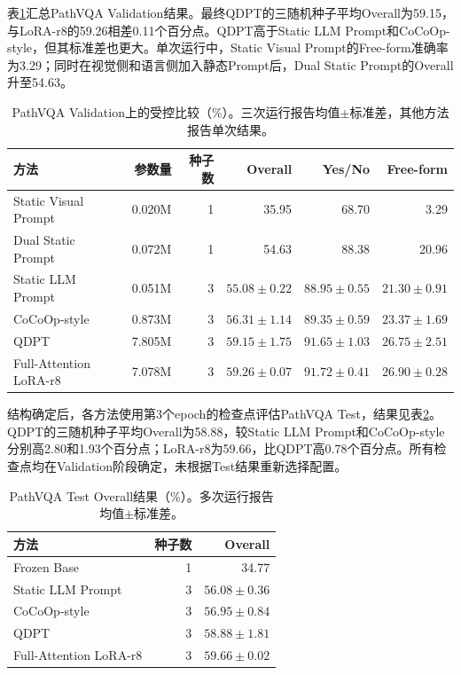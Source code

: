 \documentclass[pdflatex,sn-mathphys-num]{sn-jnl}
\begin{document}
表\ref{tab:pathvqa-main}汇总PathVQA Validation结果。最终QDPT的三随机种子平均Overall为59.15，与LoRA-r8的59.26相差0.11个百分点。QDPT高于Static LLM Prompt和CoCoOp-style，但其标准差也更大。单次运行中，Static Visual Prompt的Free-form准确率为3.29；同时在视觉侧和语言侧加入静态Prompt后，Dual Static Prompt的Overall升至54.63。

\begin{table}[t]
    \centering
    \caption{PathVQA Validation上的受控比较（\%）。三次运行报告均值$\pm$标准差，其他方法报告单次结果。}
    \label{tab:pathvqa-main}
    \scriptsize
    \setlength{\tabcolsep}{2pt}
    \begin{tabular}{@{}lrrrrr@{}}
        \toprule
        方法 & 参数量 & 种子数 & Overall & Yes/No & Free-form \\
        \midrule
        Static Visual Prompt & 0.020M & 1 & 35.95 & 68.70 & 3.29 \\
        Dual Static Prompt & 0.072M & 1 & 54.63 & 88.38 & 20.96 \\
        Static LLM Prompt & 0.051M & 3 & $55.08\pm0.22$ & $88.95\pm0.55$ & $21.30\pm0.91$ \\
        CoCoOp-style & 0.873M & 3 & $56.31\pm1.14$ & $89.35\pm0.59$ & $23.37\pm1.69$ \\
        QDPT & 7.805M & 3 & $59.15\pm1.75$ & $91.65\pm1.03$ & $26.75\pm2.51$ \\
        \midrule
        Full-Attention LoRA-r8 & 7.078M & 3 & $59.26\pm0.07$ & $91.72\pm0.41$ & $26.90\pm0.28$ \\
        \bottomrule
    \end{tabular}
\end{table}

结构确定后，各方法使用第3个epoch的检查点评估PathVQA Test，结果见表\ref{tab:pathvqa-test}。QDPT的三随机种子平均Overall为58.88，较Static LLM Prompt和CoCoOp-style分别高2.80和1.93个百分点；LoRA-r8为59.66，比QDPT高0.78个百分点。所有检查点均在Validation阶段确定，未根据Test结果重新选择配置。

\begin{table}[t]
    \centering
    \caption{PathVQA Test Overall结果（\%）。多次运行报告均值$\pm$标准差。}
    \label{tab:pathvqa-test}
    \scriptsize
    \begin{tabular}{@{}lrr@{}}
        \toprule
        方法 & 种子数 & Overall \\
        \midrule
        Frozen Base & 1 & 34.77 \\
        Static LLM Prompt & 3 & $56.08\pm0.36$ \\
        CoCoOp-style & 3 & $56.95\pm0.84$ \\
        QDPT & 3 & $58.88\pm1.81$ \\
        Full-Attention LoRA-r8 & 3 & $59.66\pm0.02$ \\
        \bottomrule
    \end{tabular}
\end{table}
\end{document}
